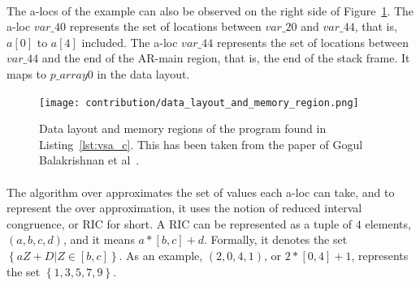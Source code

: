 \paragraph{}
The a-locs of the example can also be observed on the right side of Figure~\ref{fig:data_layout_memory_region}. The a-loc $var\_40$ represents the set of locations between $var\_20$ and $var\_44$, that is, $a[0]$ to $a[4]$ included. The a-loc $var\_44$ represents the set of locations between $var\_44$ and the end of the AR-main region, that is, the end of the stack frame. It maps to $p\_array0$ in the data layout.

\begin{figure}[!htb]
	\centering
	\texttt{[image: contribution/data\_layout\_and\_memory\_region.png]}
	\caption{Data layout and memory regions of the program found in Listing~\ref{lst:vsa_c}. This has been taken from the paper of Gogul Balakrishnan et al~\cite{balakrishnan2004analyzing}.}
	\label{fig:data_layout_memory_region}
\end{figure}

\paragraph{}
The algorithm over approximates the set of values each a-loc can take, and to represent the over approximation, it uses the notion of reduced interval congruence, or RIC for short. A RIC can be represented as a tuple of $4$ elements, $(a, b, c, d)$, and it means $a*[b, c]+d$. Formally, it denotes the set $\left\{aZ + D | Z \in [b, c]\right\}$. As an example, $(2, 0, 4, 1)$, or $2*[0, 4]+1$, represents the set $\left\{1, 3, 5, 7, 9\right\}$.

